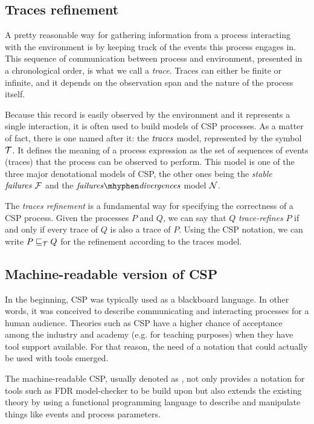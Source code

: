 \subsection{Traces refinement}

A pretty reasonable way for gathering information from a process interacting with the environment is by keeping track of the events this process engages in. This sequence of communication between process and environment, presented in a chronological order, is what we call a \emph{trace}. Traces can either be finite or infinite, and it depends on the observation span and the nature of the process itself.

Because this record is easily observed by the environment and it represents a single interaction, it is often used to build models of CSP processes. As a matter of fact, there is one named after it: the $ \mathit{\traces} $ model, represented by the symbol $ \tmodel $. It defines the meaning of a process expression as the set of sequences of events (traces) that the process can be observed to perform. This model is one of the three major denotational models of CSP, the other ones being the \emph{stable} $ \mathit{\failures} \ \fmodel $ and the $ \mathit{\failures \mhyphen \divergences} $ model $ \nmodel $.

The \emph{traces refinement} is a fundamental way for specifying the correctness of a CSP process. Given the processes $ P $ and $ Q $, we can say that $ Q $ \emph{trace-refines} $ P $ if and only if every trace of $ Q $ is also a trace of $ P $. Using the CSP notation, we can write $ P \refinedby[\tmodel] Q $ for the refinement according to the traces model.

\subsection{Machine-readable version of CSP}

In the beginning, CSP was typically used as a blackboard language. In other words, it was conceived to describe communicating and interacting processes for a human audience. Theories such as CSP have a higher chance of acceptance among the industry and academy (e.g. for teaching purposes) when they have tool support available. For that reason, the need of a notation that could actually be used with tools emerged.

The machine-readable CSP, usually denoted as \CSPM{}, not only provides a notation for tools such as FDR model-checker to be build upon but also extends the existing theory by using a functional programming language to describe and manipulate things like events and process parameters.


